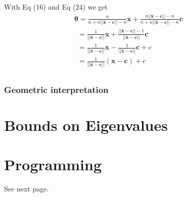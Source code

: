\documentclass{article}
\begin{document}
With Eq (16) and Eq (24) we get
\begin{align*}
&\boldsymbol{\theta}= \frac{n}{n + n ||\boldsymbol{\overline{x}} - \boldsymbol{c} || - n }\boldsymbol{\overline{x}} + \frac{n ||\boldsymbol{\overline{x}} - \boldsymbol{c} || - n}{n + n ||\boldsymbol{\overline{x}} - \boldsymbol{c} || - n}  \boldsymbol{c}&&\\
&~~= \frac{1}{||\boldsymbol{\overline{x}} - \boldsymbol{c} ||}\boldsymbol{\overline{x}} + \frac{||\boldsymbol{\overline{x}} - \boldsymbol{c} || - 1}{||\boldsymbol{\overline{x}} - \boldsymbol{c} ||}  \boldsymbol{c}&&\\
&~~= \frac{1}{||\boldsymbol{\overline{x}} - \boldsymbol{c} ||}\boldsymbol{\overline{x}}  - \frac{1}{||\boldsymbol{\overline{x}} - \boldsymbol{c} ||}  \boldsymbol{c} + c&&\\
&~~= \frac{1}{||\boldsymbol{\overline{x}} - \boldsymbol{c} ||}(\boldsymbol{\overline{x}}  - \boldsymbol{c}) + c&&\\
\end{align*}
\subsubsection*{Geometric interpretation}
\section*{Bounds on Eigenvalues }
\section{Programming}
See next page.

%

%

\end{document}
